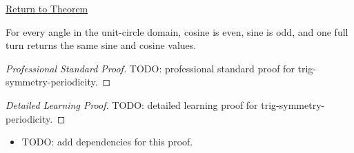 \newpage
{}
\label{prf:trig-symmetry-periodicity}

\begin{remark*}[Return]
\hyperref[thm:trig-symmetry-periodicity]{Return to Theorem}
\end{remark*}

\begin{theorem*}
For every angle in the unit-circle domain, cosine is even, sine is odd, and
one full turn returns the same sine and cosine values.
\end{theorem*}

\begin{proof}[Professional Standard Proof]
\LRAProofBodyStart
TODO: professional standard proof for trig-symmetry-periodicity.
\end{proof}

\begin{proof}[Detailed Learning Proof]
\LRAProofBodyStart
TODO: detailed learning proof for trig-symmetry-periodicity.
\end{proof}

\begin{remark*}
\end{remark*}

\begin{dependencies}
\begin{itemize}
  \item TODO: add dependencies for this proof.
\end{itemize}
\end{dependencies}

\clearpage
